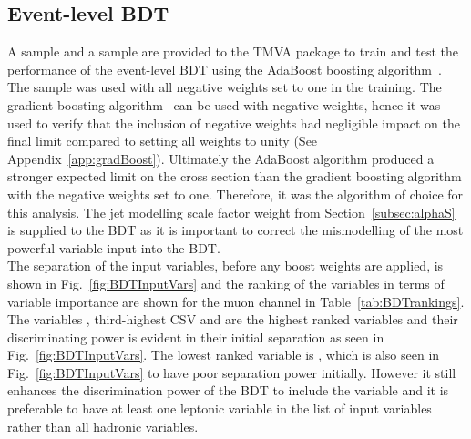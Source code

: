\subsection{Event-level BDT ~\label{sec:ELBDT13}}
A \ttbar sample and a \tttt sample are provided to the TMVA package to train and test the performance of the event-level BDT using the AdaBoost boosting algorithm~\cite{FREUND1997119}. The \MADGRAPH\aMCATNLO \tttt sample was used with all negative weights set to one in the training. The gradient boosting algorithm~\cite{mason1999boosting} can be used with negative weights, hence it was used to verify that the inclusion of negative weights had negligible impact on the final limit compared to setting all weights to unity (See Appendix~\ref{app:gradBoost}). Ultimately the AdaBoost algorithm produced a stronger expected limit on the \tttt cross section than the gradient boosting algorithm with the negative weights set to one. Therefore, it was the algorithm of choice for this analysis. The jet modelling scale factor weight from Section~\ref{subsec:alphaS} is supplied to the BDT as it is important to correct the mismodelling of the most powerful variable input into the BDT.\\
The separation of the input variables, before any boost weights are applied, is shown in Fig.~\ref{fig:BDTInputVars} and the ranking of the variables in terms of variable importance are shown for the muon channel in Table~\ref{tab:BDTrankings}. The variables \njets, third-highest CSV and \htrat are the highest ranked variables and their discriminating power is evident in their initial separation as seen in Fig.~\ref{fig:BDTInputVars}. The lowest ranked variable is \leadleppt, which is also seen in Fig.~\ref{fig:BDTInputVars} to have poor separation power initially. However it still enhances the discrimination power of the BDT to include the \leadleppt variable and it is preferable to have at least one leptonic variable in the list of input variables rather than all hadronic variables.

